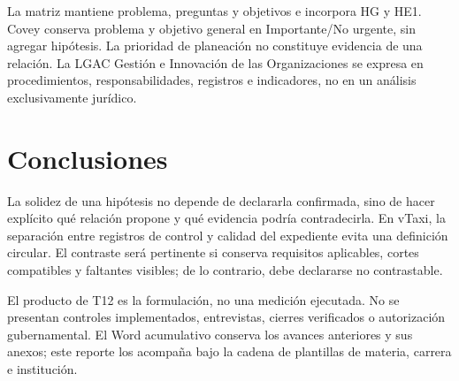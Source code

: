 {La matriz mantiene problema, preguntas y objetivos e incorpora HG y HE1. Covey conserva problema y objetivo general en Importante/No urgente, sin agregar hipótesis. La prioridad de planeación no constituye evidencia de una relación. La LGAC Gestión e Innovación de las Organizaciones se expresa en procedimientos, responsabilidades, registros e indicadores, no en un análisis exclusivamente jurídico.

\section{Conclusiones}
La solidez de una hipótesis no depende de declararla confirmada, sino de hacer explícito qué relación propone y qué evidencia podría contradecirla. En vTaxi, la separación entre registros de control y calidad del expediente evita una definición circular. El contraste será pertinente si conserva requisitos aplicables, cortes compatibles y faltantes visibles; de lo contrario, debe declararse no contrastable.

El producto de T12 es la formulación, no una medición ejecutada. No se presentan controles implementados, entrevistas, cierres verificados o autorización gubernamental. El Word acumulativo conserva los avances anteriores y sus anexos; este reporte los acompaña bajo la cadena de plantillas de materia, carrera e institución.
}
\def\seminarioreferencias{\clearpage\section*{Referencias}\addcontentsline{toc}{section}{Referencias}
Hernández Sampieri, R., Fernández Collado, C., \& Baptista Lucio, M. del P. (2014). \emph{Metodología de la investigación} (6.ª ed.). McGraw-Hill Education.\par\medskip
OECD. (2018). \emph{OECD regulatory enforcement and inspections toolkit}. OECD Publishing. \url{https://doi.org/10.1787/9789264303959-en}\par\medskip
Parker, C., \& Nielsen, V. L. (2009). Corporate compliance systems: Could they make any difference? \emph{Administration \& Society, 41}(1), 3--37. \url{https://doi.org/10.1177/0095399708328869}\par\medskip
Price, P. C., Jhangiani, R. S., \& Chiang, I.-C. A. (2015). \emph{Research methods in psychology} (2nd Canadian ed.). BCcampus. \url{https://opentextbc.ca/researchmethods/chapter/correlational-research/}\par
}
